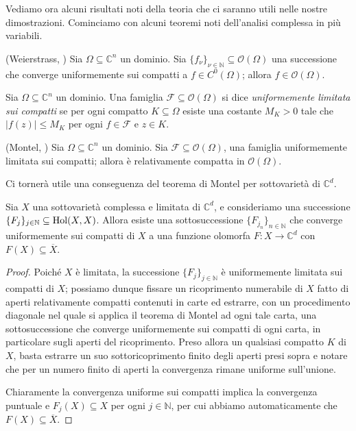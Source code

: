 Vediamo ora alcuni risultati noti della teoria che ci saranno utili nelle nostre dimostrazioni. Cominciamo con alcuni teoremi noti dell'analisi complessa in più variabili.

\begin{thm}
    (Weierstrass, \cite[Chapter 1, Proposition 5]{N}) Sia $\Omega \subseteq \mathbb{C}^n$ un dominio. Sia $\{f_{\nu}\}_{\nu\in\mathbb{N}} \subseteq \mathcal{O}(\Omega)$ una successione che converge uniformemente sui compatti a $f\in C^0(\Omega)$; allora $f\in\mathcal{O}(\Omega)$.
\end{thm}

\begin{defn}
    Sia $\Omega \subseteq \mathbb{C}^n$ un dominio. Una famiglia $\mathcal{F}\subseteq\mathcal{O}(\Omega)$ si dice \textit{uniformemente limitata sui compatti} se per ogni compatto $K\subseteq\Omega$ esiste una costante $M_K>0$ tale che $|f(z)|\le M_K$ per ogni $f\in\mathcal{F}$ e $z\in K$.
\end{defn}

\begin{thm}
    (Montel, \cite[Chapter 1, Proposition 6]{N}) Sia $\Omega \subseteq \mathbb{C}^n$ un dominio. Sia $\mathcal{F}\subseteq\mathcal{O}(\Omega)$, una famiglia uniformemente limitata sui compatti; allora è relativamente compatta in $\mathcal{O}(\Omega)$.
\end{thm}

Ci tornerà utile una conseguenza del teorema di Montel per sottovarietà di $\mathbb{C}^d$.

\begin{cor} \label{montel}
    Sia $X$ una sottovarietà complessa e limitata di $\mathbb{C}^d$, e consideriamo una successione $\{F_j\}_{j\in\mathbb{N}}\subseteq\textnormal{Hol}(X,X)$. Allora esiste una sottosuccessione $\{F_{j_n}\}_{n\in\mathbb{N}}$ che converge uniformemente sui compatti di $X$ a una funzione olomorfa $F:X\longrightarrow\mathbb{C}^d$ con $F(X)\subseteq\overline{X}$.
\end{cor}

\begin{proof}
    Poiché $X$ è limitata, la successione $\{F_j\}_{j\in\mathbb{N}}$ è uniformemente limitata sui compatti di $X$; possiamo dunque fissare un ricoprimento numerabile di $X$ fatto di aperti relativamente compatti contenuti in carte ed estrarre, con un procedimento diagonale nel quale si applica il teorema di Montel ad ogni tale carta, una sottosuccessione che converge uniformemente sui compatti di ogni carta, in particolare sugli aperti del ricoprimento. Preso allora un qualsiasi compatto $K$ di $X$, basta estrarre un suo sottoricoprimento finito degli aperti presi sopra e notare che per un numero finito di aperti la convergenza rimane uniforme sull'unione.

    Chiaramente la convergenza uniforme sui compatti implica la convergenza puntuale e $F_j(X)\subseteq X$ per ogni $j\in\mathbb{N}$, per cui abbiamo automaticamente che $F(X)\subseteq\overline{X}$.
\end{proof}

